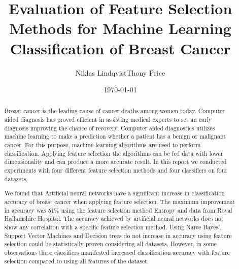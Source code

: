 \documentclass{kththesis}
\title{Evaluation of Feature Selection Methods for Machine Learning Classification of Breast Cancer}
\author{Niklas Lindqvist\newline Thony Price}
\date{\today}
\begin{document}

\frontmatter
\titlepage



\begin{abstract}

  Breast cancer is the leading cause of cancer deaths among women today. Computer aided diagnosis has proved efficient in assisting medical experts to set an early diagnosis improving the chance of recovery. Computer aided diagnostics utilizes machine learning to make a prediction whether a patient has a benign or malignant cancer. For this purpose, machine learning algorithms are used to perform classification. Applying feature selection the algorithms can be fed data with lower dimensionality and can produce a more accurate result. In this report we conducted experiments with four different feature selection methods and four classifiers on four datasets.

  We found that Artificial neural networks have a significant increase in classification accuracy of breast cancer when applying feature selection. The maximum improvement in accuracy was 51\% using the feature selection method Entropy and data from Royal Hallamshire Hospital. The accuracy achieved by artificial neural networks does not show any correlation with a specific feature selection method. Using Naïve Bayes', Support Vector Machines and Decision trees do not increase in accuracy using feature selection could be statistically proven considering all datasets. However, in some observations these classifiers manifested increased classification accuracy with feature selection compared to using all features of the dataset.

\end{abstract}


\end{document}
